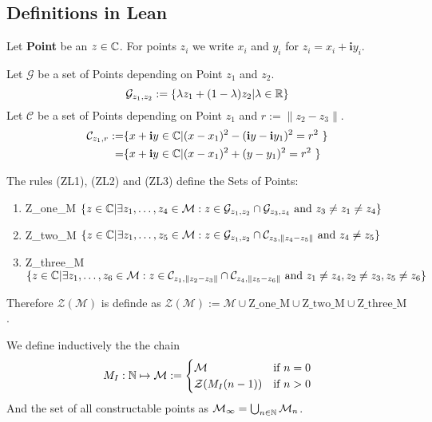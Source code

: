 \documentclass{../Proof_layout_PDF/TemplateExercise}
\begin{document}
\subsection{Definitions in Lean}
\begin{definition}
    Let \textbf{Point} be an $z\in\mathbb{C}$. For points $z_i$ we write $x_i$ and $y_i$ for $z_i = x_i +\mathbf{i}y_i$.
\end{definition}
\begin{definition}
    Let \textbf{$\mathcal{G}$} be a set of Points depending on Point $z_1$ and $z_2$.
    \begin{equation*}
        \mathcal{G}_{z_1 ,z_2} := \{\lambda z_1 + (1 - \lambda) z_2 | \lambda \in \mathbb{R}  \}
    \end{equation*}
    Let \textbf{$\mathcal{C}$} be a set of Points depending on Point $z_1$ and $r:=\|z_2-z_3\|$.
    \begin{equation*}
        \begin{aligned}
            \mathcal{C}_{z_1,r} :=& \{ x +\textbf{i} y\in \mathbb{C} | (x - x_1)^2 - (\textbf{i} y-\textbf{i} y_1)^2 =r^2  \ \}\\
            =& \{ x +\textbf{i} y\in \mathbb{C} | (x - x_1)^2 + (y-y_1)^2 =r^2  \ \}
        \end{aligned}
        \end{equation*}
\end{definition}

\begin{definition}
The rules (ZL1), (ZL2) and (ZL3) define the Sets of Points:
\begin{enumerate}
    \item Z\_one\_M $\{z\in \mathbb{C} | \exists z_1,\dots,z_4\in\mathcal{M}: z \in \mathcal{G}_{z_1,z_2} \cap \mathcal{G}_{z_3,z_4} \text{ and } z_3 \ne z_1 \ne z_4\}$
    \item Z\_two\_M $\{z\in \mathbb{C} | \exists z_1,\dots,z_5\in\mathcal{M}: z \in \mathcal{G}_{z_1,z_2} \cap \mathcal{C}_{z_3,\|z_4-z_5\|} \text{ and } z_4\ne z_5\}$
    \item Z\_three\_M $\{z\in \mathbb{C} | \exists z_1,\dots,z_6\in\mathcal{M}: z \in \mathcal{C}_{z_1,\|z_2-z_3\|}  \cap \mathcal{C}_{z_4,\|z_5-z_6\|} \text{ and } z_1\ne z_4, z_2\ne z_3,z_5\ne z_6\}$
\end{enumerate}
Therefore $\mathcal{Z(M)}$ is definde as $ \mathcal{Z(M)}:= \mathcal{M} \cup \text{Z\_one\_M}\cup\text{Z\_two\_M}\cup\text{Z\_three\_M}$.
\end{definition}

\begin{definition}
    We define inductively the the chain
    \begin{equation*}
         M_I :  \mathbb{N} \mapsto \mathcal{M} := \begin{cases}
            \mathcal{M} & \text{if } n = 0 \\
            \mathcal{Z}(M_I(n-1)) & \text{if } n > 0
        \end{cases}
    \end{equation*}
    And the set of all constructable points as $\mathcal{M}_{\infty} = \bigcup_{n \in \mathbb{N}} \mathcal{M}_n$.
\end{definition}
\end{document}
